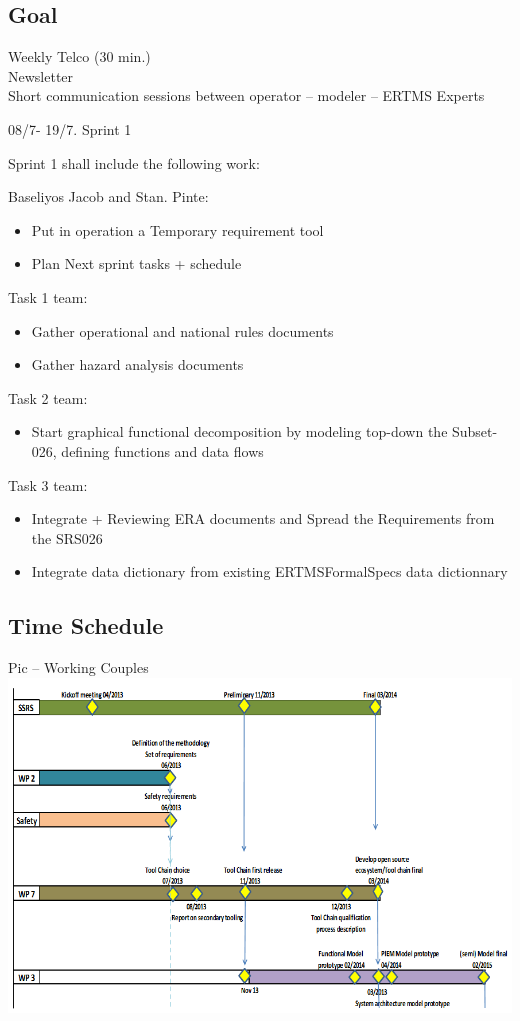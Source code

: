 \documentclass{template/openetcs_article}
\begin{document}
  \newpage 
  \subsection{Goal}
  Weekly Telco (30 min.)\\
  Newsletter\\
  Short communication sessions between operator – modeler – ERTMS Experts


08/7- 19/7. Sprint 1

Sprint 1 shall include the following work:

Baseliyos Jacob and Stan. Pinte:
\begin{itemize}
	\item Put in operation a Temporary requirement tool
	\item Plan Next sprint tasks + schedule 
\end{itemize}
Task 1 team:
\begin{itemize}
	\item Gather operational and national rules documents
	\item Gather hazard analysis documents
\end{itemize}

Task 2 team:
\begin{itemize}
	\item Start graphical functional decomposition by modeling top-down the Subset-026, defining functions and data flows
\end{itemize}
Task 3 team:
\begin{itemize}
	\item Integrate + Reviewing ERA documents and Spread the Requirements from the SRS026 
	\item Integrate data dictionary from existing ERTMSFormalSpecs data dictionnary
\end{itemize}
\newpage
\subsection{Time Schedule}
Pic  – Working Couples\\
 \includegraphics[width=15cm]{figs/time_schedule}
 
\end{document}
